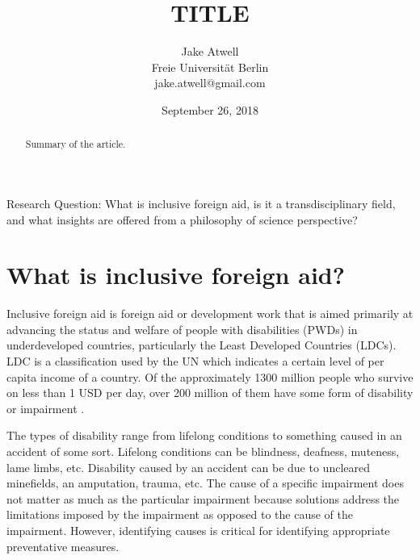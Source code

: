 \documentclass[a4paper]{article}
\begin{document}
\title{TITLE}
\author{Jake Atwell\\Freie Universität Berlin\\jake.atwell@gmail.com}
\date{September 26, 2018}

\maketitle
\newpage

\noindent Research Question: What is inclusive foreign aid, is it a
transdisciplinary field, and what insights are offered from a philosophy of
science perspective?

\tableofcontents



\begin{abstract}
Summary of the article.
\end{abstract}
\newpage
{} %




\section{What is inclusive foreign aid?}

Inclusive foreign aid is foreign aid or development work that is aimed
primarily at advancing the status and welfare of people with disabilities
(PWDs) in underdeveloped countries, particularly the Least Developed Countries
(LDCs). LDC is a classification used by the UN which indicates a certain level
of per capita income of a country. Of the approximately 1300 million people
who survive on less than 1 USD per day, over 200 million of them have some
form of disability or impairment \citep{chowdhury2006economics}. 

The types of disability range from lifelong conditions to something caused in
an accident of some sort. Lifelong conditions can be blindness, deafness,
muteness, lame limbs, etc. Disability caused by an accident can be due to
uncleared minefields, an amputation, trauma, etc. The cause of a specific
impairment does not matter as much as the particular impairment because
solutions address the limitations imposed by the impairment as opposed to the
cause of the impairment. However, identifying causes is critical for
identifying appropriate preventative measures.
\end{document}

